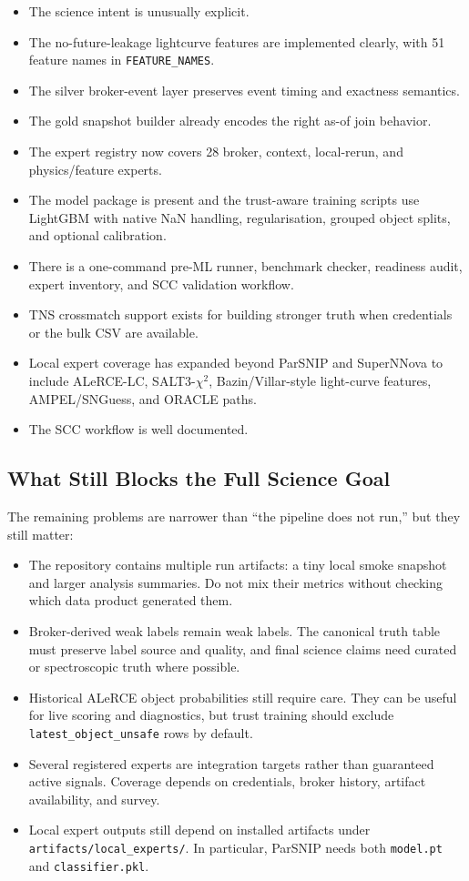 \documentclass[11pt]{article}
\newcommand{\code}[1]{\texttt{#1}}
\begin{document}
\begin{itemize}
\item The science intent is unusually explicit.
\item The no-future-leakage lightcurve features are implemented clearly, with 51 feature names in \code{FEATURE\_NAMES}.
\item The silver broker-event layer preserves event timing and exactness semantics.
\item The gold snapshot builder already encodes the right as-of join behavior.
\item The expert registry now covers 28 broker, context, local-rerun, and physics/feature experts.
\item The model package is present and the trust-aware training scripts use LightGBM with native NaN handling, regularisation, grouped object splits, and optional calibration.
\item There is a one-command pre-ML runner, benchmark checker, readiness audit, expert inventory, and SCC validation workflow.
\item TNS crossmatch support exists for building stronger truth when credentials or the bulk CSV are available.
\item Local expert coverage has expanded beyond ParSNIP and SuperNNova to include ALeRCE-LC, SALT3-\(\chi^{2}\), Bazin/Villar-style light-curve features, AMPEL/SNGuess, and ORACLE paths.
\item The SCC workflow is well documented.
\end{itemize}

\subsection{What Still Blocks the Full Science Goal}

The remaining problems are narrower than ``the pipeline does not run,'' but they still matter:

\begin{itemize}
\item The repository contains multiple run artifacts: a tiny local smoke snapshot and larger analysis summaries. Do not mix their metrics without checking which data product generated them.
\item Broker-derived weak labels remain weak labels. The canonical truth table must preserve label source and quality, and final science claims need curated or spectroscopic truth where possible.
\item Historical ALeRCE object probabilities still require care. They can be useful for live scoring and diagnostics, but trust training should exclude \code{latest\_object\_unsafe} rows by default.
\item Several registered experts are integration targets rather than guaranteed active signals. Coverage depends on credentials, broker history, artifact availability, and survey.
\item Local expert outputs still depend on installed artifacts under \code{artifacts/local\_experts/}. In particular, ParSNIP needs both \code{model.pt} and \code{classifier.pkl}.
\end{itemize}
\end{document}
